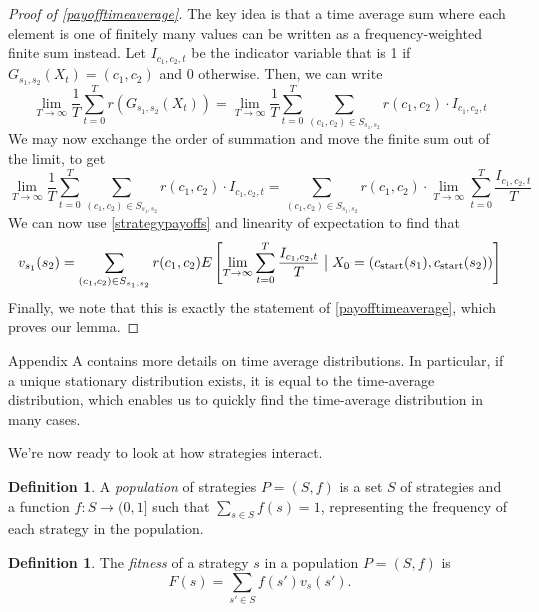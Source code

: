 \documentclass[11pt]{amsart}
\theoremstyle{definition}
\newtheorem{definition}[theorem]{Definition}
\theoremstyle{remark}
\begin{document}
\begin{proof}[Proof of \cref{payofftimeaverage}]
  The key idea is that a time average sum where each element is one of finitely many values can be written as a frequency-weighted finite sum instead. Let $I_{c_1,c_2,t}$ be the indicator variable that is 1 if $G_{s_1,s_2}(X_t) = (c_1,c_2)$ and 0 otherwise.  Then, we can write \begin{equation*}
    \lim_{T \to \infty} \frac{1}{T} \sum_{t = 0}^T r(G_{s_1,s_2}(X_t)) = 
    \lim_{T \to \infty}\frac{1}{T} \sum_{t = 0}^T \sum_{(c_1,c_2) \in S_{s_1,s_2}} r(c_1,c_2) \cdot I_{c_1,c_2,t}
  \end{equation*}
  We may now exchange the order of summation and move the finite sum out of the limit, to get \begin{equation*}
    \lim_{T \to \infty}\frac{1}{T} \sum_{t = 0}^T \sum_{(c_1,c_2) \in S_{s_1,s_2}} r(c_1,c_2) \cdot I_{c_1,c_2,t}
    = \sum_{(c_1,c_2) \in S_{s_1,s_2}} r(c_1,c_2) \cdot \lim_{T \to \infty} \sum_{t=0}^T \frac{I_{c_1,c_2,t} }{T}
  \end{equation*}
  We can now use \cref{strategypayoffs} and linearity of expectation to find that
  \begin{equation*}
    v_{s_1}(s_2) = \sum_{(c_1,c_2) \in S_{s_1,s_2}} r(c_1, c_2) E \left[ \lim_{T \to \infty} \sum_{t=0}^T \frac{I_{c_1,c_2,t}}{T} \bigm| X_0 = (c_{\text{start}}(s_1), c_{\text{start}}(s_2))
    \right]
  \end{equation*}
  Finally, we note that this is exactly the statement of \cref{payofftimeaverage}, which proves our lemma.
\end{proof}

Appendix A contains more details on time average distributions. In particular, if a unique stationary distribution exists, it is equal to the time-average distribution, which enables us to quickly find the time-average distribution in many cases.

\fi

We're now ready to look at how strategies interact.

\begin{definition}
  A \textit{population} of strategies $P = (S, f)$ is a set $S$ of strategies and a function $f : S \to (0,1]$ such that $\sum_{s \in S} f(s) = 1$, representing the frequency of each strategy in the population.
\end{definition}

\begin{definition}
  The \textit{fitness} of a strategy $s$ in a population $P = (S, f)$ is \begin{equation*}
    F(s) = \sum_{s' \in S} f(s') v_s(s').
  \end{equation*}
\end{definition}
\end{document}
